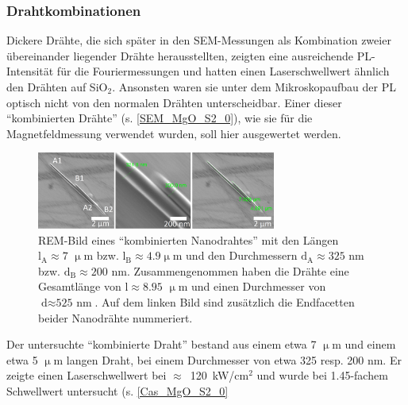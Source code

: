 \subsubsection{Drahtkombinationen} Dickere Drähte, die sich später in den
SEM-Messungen als Kombination zweier übereinander liegender Drähte
herausstellten, zeigten eine ausreichende PL-Intensität für die Fouriermessungen
und hatten einen Laserschwellwert ähnlich den Drähten auf SiO$_\text{2}$.
Ansonsten waren sie unter dem Mikroskopaufbau der PL optisch nicht von den
normalen Drähten unterscheidbar. Einer dieser ``kombinierten Drähte'' (s.
\autoref{SEM_MgO_S2_0}), wie sie für die Magnetfeldmessung verwendet wurden,
soll hier ausgewertet werden.\begin{figure}[b] \centering
\includegraphics[width=0.7\textwidth]{Bilder/MgO/SEM_MgO_S2_0} \caption{REM-Bild
eines ``kombinierten Nanodrahtes'' mit den Längen \mbox{$\text{l}_\text{A}
\approx \text{7 }\upmu\text{m}$} bzw. \mbox{$\text{l}_\text{B} \approx \text{4.9
} \upmu\text{m}$} und den Durchmessern \mbox{$\text{d}_\text{A} \approx
\text{325 nm}$} bzw. \mbox{$\text{d}_\text{B} \approx \text{200 nm}$}.
Zusammengenommen haben die Drähte eine Gesamtlänge von \mbox{$\text{l} \approx
\text{8.95 } \upmu\text{m}$} und einen Durchmesser von \mbox{$\text{d} \approx
\text{525 nm}$}. Auf dem linken Bild sind zusätzlich die Endfacetten beider
Nanodrähte nummeriert.} \label{SEM_MgO_S2_0} \end{figure} Der untersuchte
``kombinierte Draht'' bestand aus einem etwa 7 $\upmu$m und einem etwa 5
$\upmu$m langen Draht, bei einem Durchmesser von etwa 325 resp. 200 nm. Er
zeigte einen Laserschwellwert bei \mbox{$\approx$ 120 kW/cm$^\text{2}$} und
wurde bei 1.45-fachem Schwellwert untersucht (s. \autoref{Cas_MgO_S2_0}
